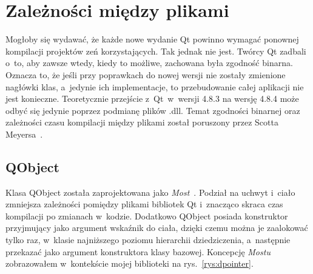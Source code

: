 
\section{Zależności między plikami}\label{sec:most}
Mogłoby się wydawać, że każde nowe wydanie Qt powinno wymagać ponownej kompilacji projektów zeń korzystających. Tak jednak nie jest. Twórcy Qt zadbali o~to, aby zawsze wtedy, kiedy to możliwe, zachowana była zgodność binarna. Oznacza to, że jeśli przy poprawkach do nowej wersji nie zostały zmienione nagłówki klas, a~jedynie ich implementacje, to przebudowanie całej aplikacji nie jest konieczne. Teoretycznie przejście z~Qt~w~wersji 4.8.3 na wersję 4.8.4 może odbyć się jedynie poprzez podmianę plików .dll. Temat zgodności binarnej oraz zależności czasu kompilacji między plikami został poruszony przez Scotta Meyersa~\cite{50Ways}.

\subsection{QObject}
Klasa QObject została zaprojektowana jako \textit{Most}~\cite{Patterns}.
Podział na uchwyt i~ciało zmniejsza zależności pomiędzy plikami bibliotek Qt i~znacząco skraca czas kompilacji po zmianach w~kodzie. Dodatkowo QObject posiada konstruktor przyjmujący jako argument wskaźnik do ciała, dzięki czemu można je zaalokować tylko raz, w~klasie najniższego poziomu hierarchii dziedziczenia, a~następnie przekazać jako argument konstruktora klasy bazowej. 
Koncepcję \textit{Mostu} zobrazowałem w~kontekście mojej biblioteki na rys.~\ref{rys:dpointer}.\newline

